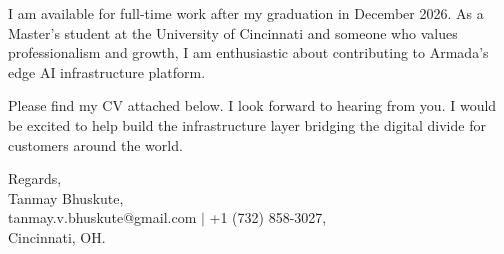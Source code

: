 \documentclass[11pt]{letter}
\begin{document}
\begin{letter}{}
I am available for full-time work after my graduation in December 2026. As a Master's student at the University of Cincinnati and someone who values professionalism and growth, I am enthusiastic about contributing to Armada's edge AI infrastructure platform.

Please find my CV attached below. I look forward to hearing from you. I would be excited to help build the infrastructure layer bridging the digital divide for customers around the world.

{\setlength{\parskip}{0pt}
Regards,\\
Tanmay Bhuskute,\\
tanmay.v.bhuskute@gmail.com $\mid$ +1 (732) 858-3027,\\
Cincinnati, OH.
}

\end{letter}
\end{document}
